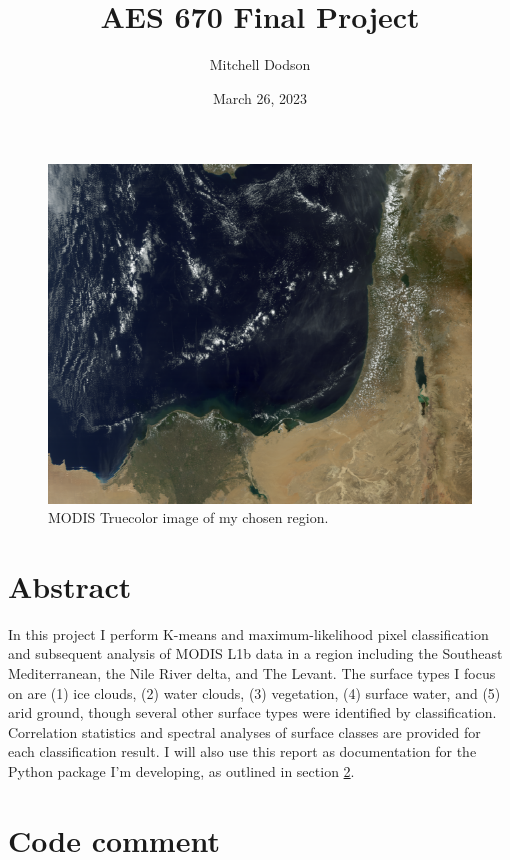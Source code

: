 \documentclass[12pt]{article}
\title{AES 670 Final Project}
\author{Mitchell Dodson}
\date{March 26, 2023}
\begin{document}
\maketitle

\begin{figure}[h!]
    \centering
    \includegraphics[width=.5\paperwidth]{figs/rgbs/rgb_TC.png}
    \caption{MODIS Truecolor image of my chosen region.}
    \label{title_image}
\end{figure}

\section{Abstract}

In this project I perform K-means and maximum-likelihood pixel classification and subsequent analysis of MODIS L1b data in a region including the Southeast Mediterranean, the Nile River delta, and The Levant. The surface types I focus on are (1) ice clouds, (2) water clouds, (3) vegetation, (4) surface water, and (5) arid ground, though several other surface types were identified by classification. Correlation statistics and spectral analyses of surface classes are provided for each classification result.  I will also use this report as documentation for the Python package I'm developing, as outlined in section \ref{code_comment}.

\clearpage

\section{Code comment}\label{code_comment}
\end{document}
